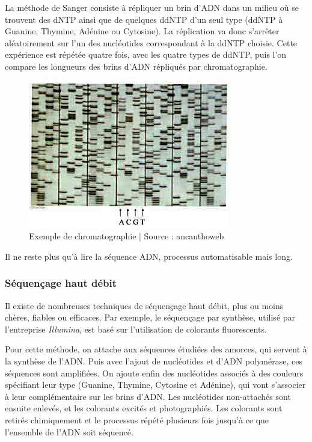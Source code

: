 La méthode de Sanger consiste à répliquer un brin d'ADN dans un milieu où se trouvent des dNTP ainsi que de quelques ddNTP d'un seul type (ddNTP à Guanine, Thymine, Adénine ou Cytosine). La réplication va donc s’arrêter aléatoirement sur l'un des nucléotides correspondant à la ddNTP choisie. Cette expérience est répétée quatre fois, avec les quatre types de ddNTP, puis l'on compare les longueurs des brins d'ADN répliqués par chromatographie.


\begin{figure}[!ht]
    \center
    \includegraphics[]{./images/chromato_acanthoweb.jpg}
    \caption{Exemple de chromatographie | Source : ancanthoweb}
    \label{chromato}
\end{figure}


Il ne reste plus qu'à lire la séquence ADN, processus automatisable mais long.

\subsubsection{Séquençage haut débit}
Il existe de nombreuses techniques de séquençage haut débit, plus ou moins chères, fiables ou efficaces.
Par exemple, le séquençage par synthèse, utilisé par l'entreprise \emph{Illumina}, est basé sur l'utilisation de colorants fluorescents.

Pour cette méthode, on attache aux séquences étudiées des amorces, qui servent à la synthèse de l'ADN. Puis avec l'ajout de nucléotides et d'ADN polymérase, ces séquences sont amplifiées. On ajoute enfin des nucléotides associés à des couleurs spécifiant leur type (Guanine, Thymine, Cytosine et Adénine), qui vont s'associer à leur complémentaire sur les brins d'ADN. Les nucléotides non-attachés sont ensuite enlevés, et les colorants excités et photographiés. Les colorants sont retirés chimiquement et le processus répété plusieurs fois jusqu'à ce que l'ensemble de l'ADN soit séquencé.

